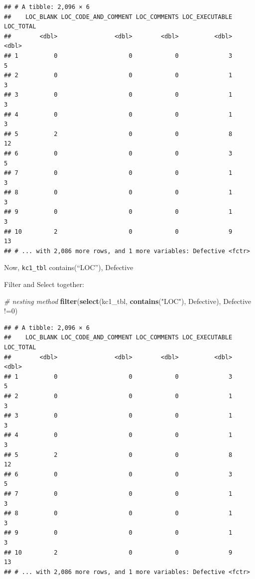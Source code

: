 \documentclass[]{book}
\newenvironment{Shaded}{\begin{snugshade}}{\end{snugshade}}
\newcommand{\KeywordTok}[1]{\textcolor[rgb]{0.13,0.29,0.53}{\textbf{{#1}}}}
\newcommand{\DecValTok}[1]{\textcolor[rgb]{0.00,0.00,0.81}{{#1}}}
\newcommand{\StringTok}[1]{\textcolor[rgb]{0.31,0.60,0.02}{{#1}}}
\newcommand{\CommentTok}[1]{\textcolor[rgb]{0.56,0.35,0.01}{\textit{{#1}}}}
\newcommand{\NormalTok}[1]{{#1}}
\begin{document}
\begin{verbatim}
## # A tibble: 2,096 × 6
##    LOC_BLANK LOC_CODE_AND_COMMENT LOC_COMMENTS LOC_EXECUTABLE LOC_TOTAL
##        <dbl>                <dbl>        <dbl>          <dbl>     <dbl>
## 1          0                    0            0              3         5
## 2          0                    0            0              1         3
## 3          0                    0            0              1         3
## 4          0                    0            0              1         3
## 5          2                    0            0              8        12
## 6          0                    0            0              3         5
## 7          0                    0            0              1         3
## 8          0                    0            0              1         3
## 9          0                    0            0              1         3
## 10         2                    0            0              9        13
## # ... with 2,086 more rows, and 1 more variables: Defective <fctr>
\end{verbatim}

Now, \texttt{kc1\_tbl} contains(``LOC''), Defective

Filter and Select together:

\begin{Shaded}
\begin{Highlighting}[]
\CommentTok{# nesting method}
\KeywordTok{filter}\NormalTok{(}\KeywordTok{select}\NormalTok{(kc1_tbl, }\KeywordTok{contains}\NormalTok{(}\StringTok{"LOC"}\NormalTok{), Defective), Defective !=}\DecValTok{0}\NormalTok{)}
\end{Highlighting}
\end{Shaded}

\begin{verbatim}
## # A tibble: 2,096 × 6
##    LOC_BLANK LOC_CODE_AND_COMMENT LOC_COMMENTS LOC_EXECUTABLE LOC_TOTAL
##        <dbl>                <dbl>        <dbl>          <dbl>     <dbl>
## 1          0                    0            0              3         5
## 2          0                    0            0              1         3
## 3          0                    0            0              1         3
## 4          0                    0            0              1         3
## 5          2                    0            0              8        12
## 6          0                    0            0              3         5
## 7          0                    0            0              1         3
## 8          0                    0            0              1         3
## 9          0                    0            0              1         3
## 10         2                    0            0              9        13
## # ... with 2,086 more rows, and 1 more variables: Defective <fctr>
\end{verbatim}
\end{document}
